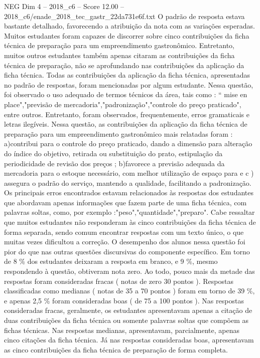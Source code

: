 \begin{textsample}{NEG Dim 4 – 2018\_c6 – Score 12.00 – 2018\_c6/enade\_2018\_tec\_gastr\_22da731e6f.txt}
O padrão de resposta estava bastante detalhado, favorecendo a atribuição da nota com as variações esperadas.
Muitos estudantes foram capazes de discorrer sobre cinco contribuições da ficha técnica de preparação para um empreendimento gastronômico.
Entretanto, muitos outros estudantes também apenas citaram as contribuições da ficha técnica de preparação, não se aprofundando nas contribuições da aplicação da ficha técnica.
Todas as contribuições da aplicação da ficha técnica, apresentadas no padrão de respostas, foram mencionadas por algum estudante.
Nessa questão, foi observado o uso adequado de termos técnicos da área, tais como : “ mise en place","previsão de mercadoria","padronização","controle do preço praticado", entre outros.
Entretanto, foram observados, frequentemente, erros gramaticais e letras ilegíveis.
Nessa questão, as contribuições da aplicação da ficha técnica de preparação para um empreendimento gastronômico mais relatadas foram : a)contribui para o controle do preço praticado, dando a dimensão para alteração do índice do objetivo, retirada ou substituição do prato, estipulação da periodicidade de revisão dos preços ; b)favorece a previsão adequada da mercadoria para o estoque necessário, com melhor utilização de espaço para e c ) assegura o padrão do serviço, mantendo a qualidade, facilitando a padronização.
Os principais erros encontrados estavam relacionados às respostas dos estudantes que abordavam apenas informações que fazem parte de uma ficha técnica, com palavras soltas, como, por exemplo :"peso","quantidade","preparo".
Cabe ressaltar que muitos estudantes não responderam às cinco contribuições da ficha técnica de forma separada, sendo comum encontrar respostas com um texto único, o que muitas vezes dificultou a correção.
O desempenho dos alunos nessa questão foi pior do que nas outras questões discursivas do componente específico.
Em torno de 8 \% dos estudantes deixaram a resposta em branco, e 9 \%, mesmo respondendo à questão, obtiveram nota zero.
Ao todo, pouco mais da metade das respostas foram consideradas fracas ( notas de zero 30 pontos ).
Respostas classificadas como medianas ( notas de 35 a 70 pontos ) foram em torno de 39 \%, e apenas 2,5 \% foram consideradas boas ( de 75 a 100 pontos ).
Nas respostas consideradas fracas, geralmente, os estudantes apresentavam apenas a citação de duas contribuições da ficha técnica ou somente palavras soltas que compõem as fichas técnicas.
Nas respostas medianas, apresentavam, parcialmente, apenas cinco citações da ficha técnica.
Já nas respostas consideradas boas, apresentavam as cinco contribuições da ficha técnica de preparação de forma completa.

\end{textsample}
